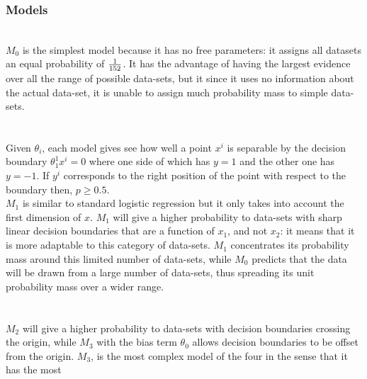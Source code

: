 \documentclass[a4paper,11pt]{article}
\theoremstyle{mytheor}
\begin{document}
\subsubsection{Models}
\smallskip
\\$M_0$ is the simplest model because it has no free parameters: it assigns all datasets an equal probability of $1\over152$. It has the advantage of having the largest evidence over all the range of possible data-sets, but it since it uses no information about the actual data-set, it is unable to assign much probability mass to simple data-sets.\\\\
\smallskip
\\Given $\theta_i$, each model gives see how well a point $x^i$ is separable by the decision boundary $\theta_1^1x^i=0$ where one side of which has $y=1$ and the other one has $y=-1$. If $y^i$ corresponds to the right position of the point with respect to the boundary then, $p \geq 0.5$.\\
$M_1$ is similar to standard logistic regression but it only takes into account the first dimension of $x$. $M_1$ will give a higher probability to data-sets with sharp linear decision boundaries that are a function of $x_1$, and not $x_2$: it means that it is more adaptable to this category of data-sets. $M_1$ concentrates its probability mass around this limited number of data-sets, while $M_0$ predicts that the data will be drawn from a large number of data-sets, thus spreading its unit probability mass over a wider range. 
\smallskip
\\\\
\smallskip
\\
$M_2$ will give a higher probability to data-sets with decision boundaries crossing the origin, while $M_3$ with the bias term $\theta_0$ allows decision boundaries to be offset from the origin. $M_3$, is the most complex model of the four in the sense that it has the most
\end{document}
